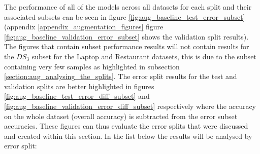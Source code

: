 The performance of all of the models across all datasets for each split and their associated subsets can be seen in figure \ref{fig:aug_baseline_test_error_subset} (appendix \ref{appendix_augmentation_figures} figure \ref{fig:aug_baseline_validation_error_subset} shows the validation split results). The figures that contain subset performance results will not contain results for the $DS_3$ subset for the Laptop and Restaurant datasets, this is due to the subset containing very few samples as highlighted in subsection \ref{section:aug_analysing_the_splits}. The error split results for the test and validation splits are better highlighted in figures \ref{fig:aug_baseline_test_error_diff_subset} and \ref{fig:aug_baseline_validation_error_diff_subset} respectively where the accuracy on the whole dataset (overall accuracy) is subtracted from the error subset accuracies. These figures can thus evaluate the error splits that were discussed and created within this section. In the list below the results will be analysed by error split:

